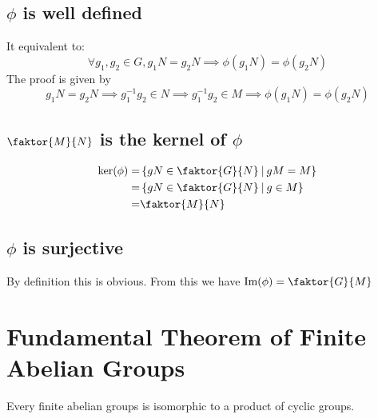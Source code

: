\documentclass{article}
\renewcommand{\Im}{\text{Im}}
\begin{document}
	\subsection*{$\phi$ is well defined}
	It equivalent to:$$
	\forall g_1,g_2\in G, g_1N=g_2N\implies \phi(g_1N)=\phi(g_2N)$$
	The proof is given by$$
	 g_1N=g_2N\implies g_1^{-1}g_2\in N\implies g_1^{-1}g_2\in M\implies \phi(g_1N)=\phi(g_2N)
	$$
	\subsection*{$\faktor{M}{N}$ is the kernel of $\phi$}
	\begin{align*}
		\ker(\phi) =& \left\{gN\in\faktor{G}{N}\ \vline\ gM=M \right\}\\
				   =& \left\{gN\in\faktor{G}{N}\ \vline\ g\in M \right\}\\
				   =& \faktor{M}{N}
	\end{align*}
	\subsection*{$\phi$ is surjective}
	By definition this is obvious. From this we have $\Im(\phi)=\faktor{G}{M}$
	
	\section*{Fundamental Theorem of Finite Abelian Groups}
		Every finite abelian groups is isomorphic to a product of cyclic groups.
\end{document}
